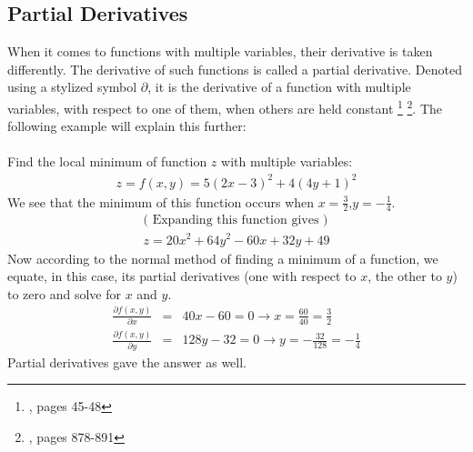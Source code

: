 \subsection{Partial Derivatives}
When it comes to functions with multiple variables, their derivative is taken differently. The derivative of such functions is called a partial derivative. Denoted using a stylized symbol $\partial$, it is the derivative of a function with multiple variables, with respect to one of them, when others are held constant \footnote{\cite{matthews_1998}, pages 45-48} \footnote{\cite{stewart_2008_deriv}, pages 878-891}. The following example will explain this further:\\
\\
Find the local minimum of function $z$ with multiple variables:
\begin{gather*}
z = f(x,y) = 5(2x-3)^{2} + 4(4y+1)^{2}
\end{gather*}
We see that the minimum of this function occurs when $x= \frac{3}{2} $,$ y= -\frac{1}{4}$.
\begin{gather*}
\text{( Expanding this function gives )}\\
z = 20x^{2} + 64y^{2} -60x + 32y +49
\end{gather*}
Now according to the normal method of finding a minimum of a function, we equate, in this case, its partial derivatives (one with respect to $x$, the other to $y$) to zero and solve for $x$ and $y$.
\begin{eqnarray*}
\frac{\partial f(x,y)}{\partial x}  &=&  40x-60 = 0 \rightarrow x = \frac{60}{40}=\frac{3}{2}\\
\frac{\partial f(x,y)}{\partial y}  &=&  128y-32 = 0 \rightarrow y = -\frac{32}{128}=-\frac{1}{4}
\end{eqnarray*}
Partial derivatives gave the answer as well.

